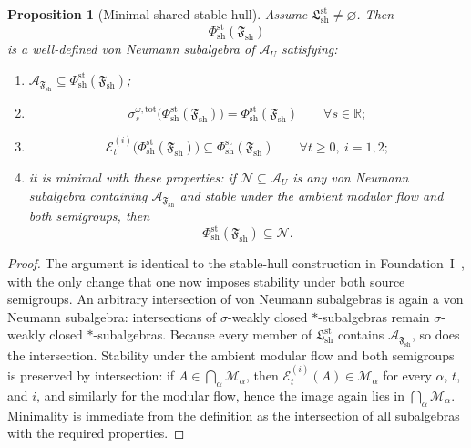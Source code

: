 \documentclass[12pt]{article}
\newtheorem{proposition}[theorem]{Proposition}
\theoremstyle{definition}
\theoremstyle{remark}
\begin{document}
\begin{proposition}[Minimal shared stable hull]
\label{prop:sharedhull}
Assume \(\mathfrak L_{\mathrm{sh}}^{\mathrm{st}}\neq\varnothing\). Then
\[
\Phi_{\mathrm{sh}}^{\mathrm{st}}(\mathfrak F_{\mathrm{sh}})
\]
is a well-defined von Neumann subalgebra of \(\mathcal A_U\) satisfying:
\begin{enumerate}
\item
  \(\mathcal A_{\mathfrak F_{\mathrm{sh}}}\subseteq
  \Phi_{\mathrm{sh}}^{\mathrm{st}}(\mathfrak F_{\mathrm{sh}})\);
\item
  \[
  \sigma_s^{\omega,\mathrm{tot}}
  \bigl(\Phi_{\mathrm{sh}}^{\mathrm{st}}(\mathfrak F_{\mathrm{sh}})\bigr)
  =
  \Phi_{\mathrm{sh}}^{\mathrm{st}}(\mathfrak F_{\mathrm{sh}})
  \qquad
  \forall s\in\mathbb R;
  \]
\item
  \[
  \mathcal E_t^{(i)}
  \bigl(\Phi_{\mathrm{sh}}^{\mathrm{st}}(\mathfrak F_{\mathrm{sh}})\bigr)
  \subseteq
  \Phi_{\mathrm{sh}}^{\mathrm{st}}(\mathfrak F_{\mathrm{sh}})
  \qquad
  \forall t\ge 0,\ i=1,2;
  \]
\item it is minimal with these properties: if
  \(\mathcal N\subseteq\mathcal A_U\) is any von Neumann subalgebra
  containing \(\mathcal A_{\mathfrak F_{\mathrm{sh}}}\) and stable
  under the ambient modular flow and both semigroups, then
  \[
  \Phi_{\mathrm{sh}}^{\mathrm{st}}(\mathfrak F_{\mathrm{sh}})
  \subseteq
  \mathcal N.
  \]
\end{enumerate}
\end{proposition}

\begin{proof}
The argument is identical to the stable-hull construction in
Foundation~I~\cite{FoundationI}, with the only change that one now
imposes stability under both source semigroups. An arbitrary
intersection of von Neumann subalgebras is again a von Neumann
subalgebra: intersections of \(\sigma\)-weakly closed
\(*\)-subalgebras remain \(\sigma\)-weakly closed \(*\)-subalgebras.
Because every member of
\(\mathfrak L_{\mathrm{sh}}^{\mathrm{st}}\) contains
\(\mathcal A_{\mathfrak F_{\mathrm{sh}}}\), so does the intersection.
Stability under the ambient modular flow and both semigroups is
preserved by intersection: if \(A\in\bigcap_{\alpha}\mathcal M_\alpha\),
then \(\mathcal E_t^{(i)}(A)\in\mathcal M_\alpha\) for every
\(\alpha\), \(t\), and \(i\), and similarly for the modular flow, hence
the image again lies in \(\bigcap_{\alpha}\mathcal M_\alpha\).
Minimality is immediate from the definition as the intersection of all
subalgebras with the required properties.
\end{proof}
\end{document}
